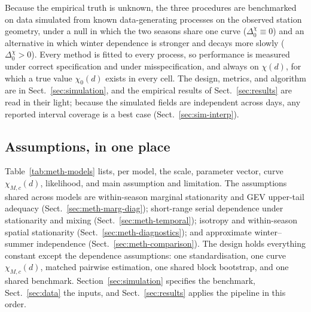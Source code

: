 Because the empirical truth is unknown, the three procedures are benchmarked on data simulated from known data-generating processes on the observed station geometry, under a null in which the two seasons share one curve (\(\Delta_0^{\chi}\equiv0\)) and an alternative in which winter dependence is stronger and decays more slowly (\(\Delta_0^{\chi}>0\)). Every method is fitted to every process, so performance is measured under correct specification and under misspecification, and always on \(\chi(d)\), for which a true value \(\chi_0(d)\) exists in every cell. The design, metrics, and algorithm are in Sect.~\ref{sec:simulation}, and the empirical results of Sect.~\ref{sec:results} are read in their light; because the simulated fields are independent across days, any reported interval coverage is a best case (Sect.~\ref{sec:sim-interp}).

\subsection{Assumptions, in one place}\label{sec:meth-summary}

Table~\ref{tab:meth-models} lists, per model, the scale, parameter vector, curve \(\chi_{M,c}(d)\), likelihood, and main assumption and limitation. The assumptions shared across models are within-season marginal stationarity and GEV upper-tail adequacy (Sect.~\ref{sec:meth-marg-diag}); short-range serial dependence under stationarity and mixing (Sect.~\ref{sec:meth-temporal}); isotropy and within-season spatial stationarity (Sect.~\ref{sec:meth-diagnostics}); and approximate winter--summer independence (Sect.~\ref{sec:meth-comparison}). The design holds everything constant except the dependence assumptions: one standardisation, one curve \(\chi_{M,c}(d)\), matched pairwise estimation, one shared block bootstrap, and one shared benchmark. Section~\ref{sec:simulation} specifies the benchmark, Sect.~\ref{sec:data} the inputs, and Sect.~\ref{sec:results} applies the pipeline in this order.